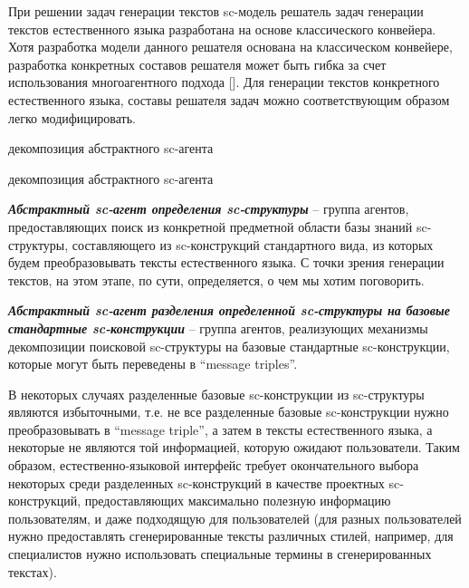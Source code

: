 При решении задач генерации текстов sc-модель решатель задач генерации текстов естественного языка разработана на основе классического конвейера. Хотя разработка модели данного решателя основана на классическом конвейере, разработка конкретных составов решателя может быть гибка за счет использования многоагентного подхода []. Для генерации текстов конкретного естественного языка, составы решателя задач можно соответствующим образом легко модифицировать.
\begin{SCn}
	\begin{scnrelfromset}{декомпозиция абстрактного sc-агента}
	\end{scnrelfromset}
\end{SCn}

\begin{SCn}
	\begin{scnrelfromset}{декомпозиция абстрактного sc-агента}
	\end{scnrelfromset}
\end{SCn}

\textit{\textbf{Абстрактный sc-агент определения sc-структуры}} -- группа агентов, предоставляющих поиск из конкретной предметной области базы знаний sc-структуры, составляющего из sc-конструкций стандартного вида, из которых будем преобразовывать тексты естественного языка. С точки зрения генерации текстов, на этом этапе, по сути, определяется, о чем мы хотим поговорить. 

\textit{\textbf{Абстрактный sc-агент разделения определенной sc-структуры на базовые стандартные sc-конструкции}} -- группа агентов, реализующих механизмы декомпозиции поисковой sc-структуры на базовые стандартные sc-конструкции, которые могут быть переведены в ``message triples''. 

В некоторых случаях разделенные базовые sc-конструкции из sc-структуры являются избыточными, т.е. не все разделенные базовые sc-конструкции нужно преобразовывать в ``message triple'', а затем в тексты естественного языка, а некоторые не являются той информацией, которую ожидают пользователи. Таким образом, естественно-языковой интерфейс требует окончательного выбора некоторых среди разделенных sc-конструкций в качестве проектных sc-конструкций, предоставляющих максимально полезную информацию пользователям, и даже подходящую для пользователей (для разных пользователей нужно предоставлять сгенерированные тексты различных стилей, например, для специалистов нужно использовать специальные термины в сгенерированных текстах). 

